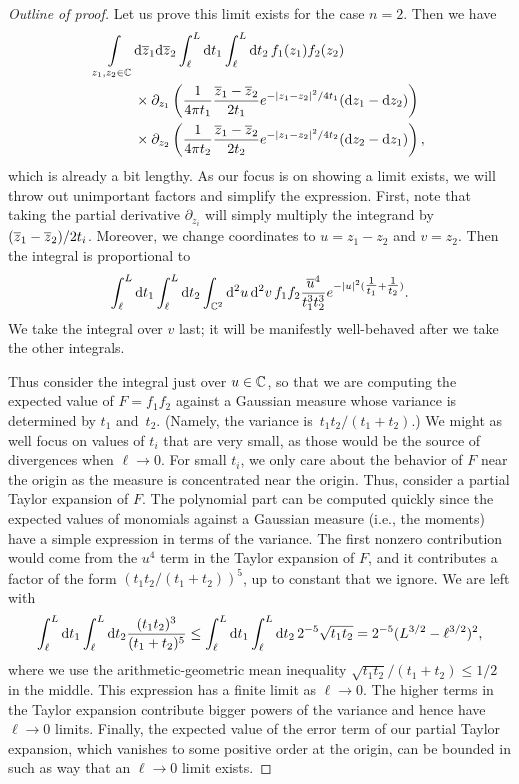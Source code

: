 \begin{proof}[Outline of proof]
Let us prove this limit exists for the case $n=2$.
Then we have
\begin{align*}
\int\displaylimits_{z_1,z_2 \in \mathbb C} & {\rm d}\overline{z}_1{\rm d}\overline{z}_2 \int_{\ell}^L {\rm d} t_1 \int_{\ell}^L {\rm d} t_2\, 
 f_1(z_1)f_2(z_2) \\
& \times \partial_{z_1} \left(\frac{1}{4\pi t_1} \frac{\overline{z}_1 - \overline{z}_2}{2t_1} e^{-|z_1-z_2|^2/4t_1} ({\rm d} z_1 - {\rm d} z_2) \right) \\ 
& \times \partial_{z_2} \left(\frac{1}{4\pi t_2} \frac{\overline{z}_1 - \overline{z}_2}{2t_2} e^{-|z_1-z_2|^2/4t_2} ({\rm d} z_2 - {\rm d} z_1) \right),
\end{align*}
which is already a bit lengthy.
As our focus is on showing a limit exists, we will throw out unimportant factors and simplify the expression.
First, note that taking the partial derivative $\partial_{z_i}$ will simply multiply the integrand by $(\overline{z}_1 - \overline{z}_2)/2t_i$.
Moreover, we change coordinates to $u = z_1 - z_2$ and $v = z_2$. 
Then the integral is proportional to
\[
\int_{\ell}^L {\rm d} t_1 \int_{\ell}^L {\rm d} t_2\int_{\mathbb C^2} {\rm d}^2 u \, {\rm d}^2 v \, f_1 f_2 \frac{\overline{u}^4}{t_1^3 t_2^3} e^{-|u|^2(\tfrac{1}{t_1} + \tfrac{1}{t_2})}.
\]
We take the integral over $v$ last;
it will be manifestly well-behaved after we take the other integrals.

Thus consider the integral just over $u \in \mathbb C$,
so that we are computing the expected value of $F=f_1 f_2$ against a Gaussian measure 
whose variance is determined by $t_1$ and~$t_2$.
(Namely, the variance is~$t_1 t_2/(t_1+t_2)$.)
We might as well focus on values of $t_i$ that are very small, 
as those would be the source of divergences when $\ell \to 0$.
For small $t_i$, we only care about the behavior of $F$ near the origin as the measure is concentrated near the origin.
Thus, consider a partial Taylor expansion of $F$.
The polynomial part can be computed quickly since the expected values of monomials against a Gaussian measure (i.e., the moments) have a simple expression in terms of the variance.
The first nonzero contribution would come from the $u^4$ term in the Taylor expansion of $F$,
and it contributes a factor of the form $(t_1 t_2/(t_1+t_2))^5$,
up to constant that we ignore.
We are left with
\[
\int_{\ell}^L {\rm d} t_1 \int_{\ell}^L {\rm d} t_2 \frac{(t_1t_2)^{3}}{(t_1 + t_2)^{5}} 
\leq \int_{\ell}^L {\rm d} t_1 \int_{\ell}^L {\rm d} t_2 \, 2^{-5}\sqrt{t_1t_2} 
= 2^{-5}(L^{3/2} - {\ell}^{3/2})^2,
\]
where we use the arithmetic-geometric mean inequality $\sqrt{t_1t_2}/(t_1+t_2)\leq 1/2$ in the middle.
This expression has a finite limit as $\ell \to 0$.
The higher terms in the Taylor expansion contribute bigger powers of the variance 
and hence have $\ell \to 0$ limits.
Finally, the expected value of the error term of our partial Taylor expansion, 
which vanishes to some positive order at the origin,
can be bounded in such as way that an $\ell \to 0$ limit exists.
\end{proof}

